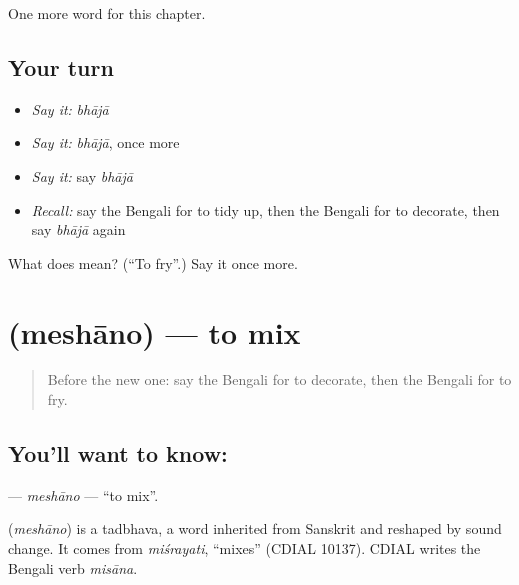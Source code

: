 \begin{grammarlens}[title={What you've built}]
One more word for this chapter.
\end{grammarlens}

\subsection*{Your turn}
\begin{itemize}
\raggedright
  \item \emph{Say it:} \emph{bhājā}
  \item \emph{Say it:} \emph{bhājā}, once more
  \item \emph{Say it:} say \emph{bhājā}
  \item \emph{Recall:} say the Bengali for to tidy up, then the Bengali for to decorate, then say \emph{bhājā} again
\end{itemize}

\begin{tcolorbox}[breakable,colback=teal!4,colframe=teal!35!black,title={Before you move on}]
What does  mean? (\textquotedblleft{}To fry\textquotedblright{}.) Say it once more.
\end{tcolorbox}
\section[\texorpdfstring{\bn{মেশানো} (meshāno)}{মেশানো (meshāno)}]{ (meshāno) — to mix}

\label{lesson:BN-C105-meshano}



\begin{quote}
Before the new one: say the Bengali for to decorate, then the Bengali for to fry.
\end{quote}

\subsection*{You'll want to know: }
\textbf{} — \emph{meshāno} — \textquotedblleft{}to mix\textquotedblright{}.

\begin{cousinweb}
\textbf{} (\emph{meshāno}) is a tadbhava, a word inherited from Sanskrit and reshaped by sound change. It comes from \emph{miśrayati}, \textquotedblleft{}mixes\textquotedblright{} (CDIAL 10137). CDIAL writes the Bengali verb \emph{misāna}.
\end{cousinweb}

